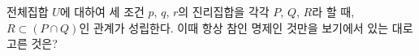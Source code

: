 전체집합 $U$에 대하여 세 조건 $p$, $q$, $r$의 진리집합을 각각 $P$, $Q$, $R$라 할 때, $R\subset(P\cap Q)$인 관계가 성립한다. 이때 항상 참인 명제인 것만을 보기에서 있는 대로 고른 것은?
